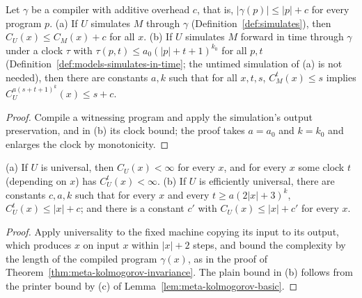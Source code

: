 \begin{theorem}
  \label{thm:meta-kolmogorov-invariance}
  \leanok
  Let $\gamma$ be a compiler with additive overhead $c$, that is,
  $|\gamma(p)| \le |p| + c$ for every program $p$. (a) If $U$ simulates $M$
  through $\gamma$ (Definition~\ref{def:simulates}), then
  $C_U(x) \le C_M(x) + c$ for all $x$. (b) If $U$ simulates $M$ forward in
  time through $\gamma$ under a clock $\tau$ with
  $\tau(p, t) \le a_0(|p| + t + 1)^{k_0}$ for all $p, t$
  (Definition~\ref{def:models-simulates-in-time}; the untimed simulation of
  (a) is not needed), then there are constants $a, k$ such that for all
  $x, t, s$, $C^t_M(x) \le s$ implies $C^{a(s+t+1)^k}_U(x) \le s + c$.
\end{theorem}
\begin{proof}
  \leanok
  Compile a witnessing program and apply the simulation's output
  preservation, and in (b) its clock bound; the proof takes $a = a_0$ and
  $k = k_0$ and enlarges the clock by monotonicity.
\end{proof}

\begin{theorem}
  \label{thm:meta-universal-kolmogorov}
  \leanok
  (a) If $U$ is universal, then $C_U(x) < \infty$ for every $x$, and for
  every $x$ some clock $t$ (depending on $x$) has $C^t_U(x) < \infty$.
  (b) If $U$ is efficiently universal, there are constants $c, a, k$ such
  that for every $x$ and every $t \ge a(2|x|+3)^k$, $C^t_U(x) \le |x| + c$;
  and there is a constant $c'$ with $C_U(x) \le |x| + c'$ for every $x$.
\end{theorem}
\begin{proof}
  \leanok
  Apply universality to the fixed machine copying its input to its output,
  which produces $x$ on input $x$ within $|x| + 2$ steps, and bound the
  complexity by the length of the compiled program $\gamma(x)$, as in the
  proof of Theorem~\ref{thm:meta-kolmogorov-invariance}. The plain bound in
  (b) follows from the printer bound by (c) of
  Lemma~\ref{lem:meta-kolmogorov-basic}.
\end{proof}

